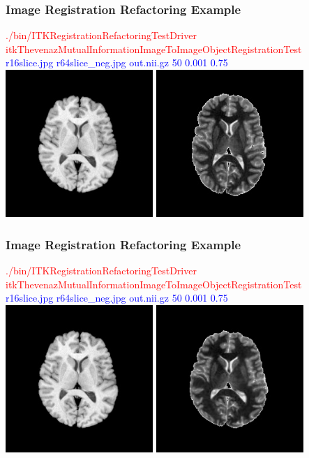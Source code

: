 \begin{frame}
\frametitle{Image Registration Refactoring Example}
\textcolor{red}{./bin/ITKRegistrationRefactoringTestDriver itkThevenazMutualInformationImageToImageObjectRegistrationTest }\\
\textcolor{blue}{r16slice.jpg r64slice\_neg.jpg out.nii.gz  50 0.001 0.75 }\\
\includegraphics[height=2.2in]{../Art/r16slice.jpg}
\includegraphics[height=2.2in]{../Art/r64slice_neg.jpg}
\end{frame}

\begin{frame}
\frametitle{Image Registration Refactoring Example}
\textcolor{red}{./bin/ITKRegistrationRefactoringTestDriver itkThevenazMutualInformationImageToImageObjectRegistrationTest }\\
\textcolor{blue}{r16slice.jpg r64slice\_neg.jpg out.nii.gz  50 0.001 0.75 }\\
\includegraphics[height=2.2in]{../Art/r16slice.jpg}
\includegraphics[height=2.2in]{../Art/r64slice_neg_to_16.jpg}
\end{frame}
